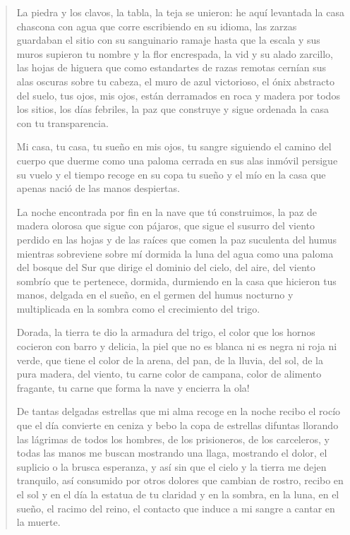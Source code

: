 \documentclass[12pt]{article}
\begin{document}
\clearpage
{}
\begin{verse}
La piedra y los clavos, la tabla, la teja se unieron: he aquí levantada  
la casa chascona con agua que corre escribiendo en su idioma,  
las zarzas guardaban el sitio con su sanguinario ramaje  
hasta que la escala y sus muros supieron tu nombre  
y la flor encrespada, la vid y su alado zarcillo,  
las hojas de higuera que como estandartes de razas remotas  
cernían sus alas oscuras sobre tu cabeza,  
el muro de azul victorioso, el ónix abstracto del suelo,  
tus ojos, mis ojos, están derramados en roca y madera  
por todos los sitios, los días febriles, la paz que construye  
y sigue ordenada la casa con tu transparencia.  

Mi casa, tu casa, tu sueño en mis ojos, tu sangre siguiendo el camino del cuerpo que duerme  
como una paloma cerrada en sus alas inmóvil persigue su vuelo  
y el tiempo recoge en su copa tu sueño y el mío  
en la casa que apenas nació de las manos despiertas.  

La noche encontrada por fin en la nave que tú construimos,  
la paz de madera olorosa que sigue con pájaros,  
que sigue el susurro del viento perdido en las hojas  
y de las raíces que comen la paz suculenta del humus  
mientras sobreviene sobre mí dormida la luna del agua  
como una paloma del bosque del Sur que dirige el dominio  
del cielo, del aire, del viento sombrío que te pertenece,  
dormida, durmiendo en la casa que hicieron tus manos,  
delgada en el sueño, en el germen del humus nocturno  
y multiplicada en la sombra como el crecimiento del trigo.  

Dorada, la tierra te dio la armadura del trigo,  
el color que los hornos cocieron con barro y delicia,  
la piel que no es blanca ni es negra ni roja ni verde,  
que tiene el color de la arena, del pan, de la lluvia,  
del sol, de la pura madera, del viento,  
tu carne color de campana, color de alimento fragante,  
tu carne que forma la nave y encierra la ola!  

De tantas delgadas estrellas que mi alma recoge en la noche  
recibo el rocío que el día convierte en ceniza  
y bebo la copa de estrellas difuntas llorando las lágrimas  
de todos los hombres, de los prisioneros, de los carceleros,  
y todas las manos me buscan mostrando una llaga,  
mostrando el dolor, el suplicio o la brusca esperanza,  
y así sin que el cielo y la tierra me dejen tranquilo,  
así consumido por otros dolores que cambian de rostro,  
recibo en el sol y en el día la estatua de tu claridad  
y en la sombra, en la luna, en el sueño, el racimo del reino,  
el contacto que induce a mi sangre a cantar en la muerte.  


\end{verse}
\end{document}
